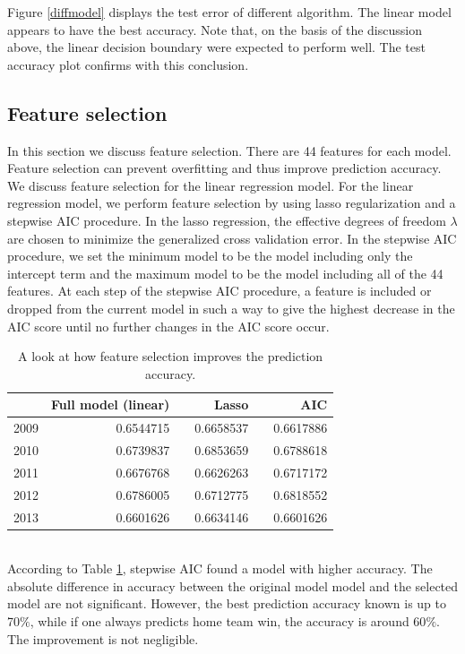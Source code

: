 \documentclass{article} %
\begin{document}
		Figure \ref{diffmodel} displays the test error of different algorithm. The linear model appears to have the best accuracy.  Note that, on the basis of the discussion above, the linear decision boundary were expected to perform well. The test accuracy plot confirms with this conclusion.\\
	

	
	
	
	
	\subsection{Feature selection}
	In this section we discuss feature selection. There are 44 features for each model. Feature selection can  prevent overfitting and thus improve prediction accuracy. We discuss feature selection for the linear regression model. For the  linear regression model, we perform feature selection by using lasso regularization and a stepwise AIC procedure. In the lasso regression, the effective degrees of freedom $\lambda$ are chosen to minimize the generalized cross validation error.  In the stepwise AIC procedure, we set the minimum model to be the model including only the intercept term and the maximum model to be the model including all of the 44 features. At each step of the stepwise AIC procedure, a feature is included or dropped from the current model in such a way to give the highest decrease in the AIC score until no further changes in the AIC score occur.  
			\\
			\begin{table}[ht]
	\centering
	\begin{tabular}{rrrrrr}
	  \hline
		 & Full model (linear) & & Lasso & & AIC \\ 
	  \hline
		2009 & 0.6544715 && 0.6658537 && 0.6617886  \\ 
	  	2010 &0.6739837  &&0.6853659 &&0.6788618    \\ 
	  	2011 & 0.6676768 & &  0.6626263 &&  0.6717172  \\ 
	  	2012 &0.6786005& & 0.6712775 && 0.6818552  \\ 
	  	2013 & 0.6601626 && 0.6634146 && 0.6601626  \\ 

	   \hline
	\end{tabular}
	\caption{A look at how feature selection improves the prediction accuracy.}
	\label{table:matrix}
	\label{featsel}
	\end{table}
	\\
	According to Table \ref{featsel}, stepwise AIC found a model with higher accuracy. The absolute difference in accuracy between the original model model and the selected model are not significant. However, the best prediction accuracy known is up to 70$\%$, while if one always predicts home team win, the accuracy is around 60$\%$. The improvement is not negligible.
\end{document}
